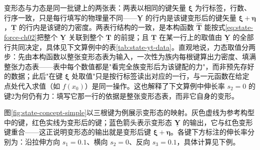 变形态与力态是同一批键上的两张表：两表以相同的键矢量 $\boldsymbol{\xi}$ 为行标签，行数、行序一致，只是每行填写的物理量不同——$\underline{\mathbf{Y}}$ 的行内是该键变形后的键矢量 $\boldsymbol{\xi}+\boldsymbol{\eta}$，$\underline{\mathbf{T}}$ 的行内是该键的力密度。两表行结构的一致，是本构函数 $\hat{\underline{\mathbf{T}}}$ 能按式\eqref{eq:state-force-ch02}把整个 $\underline{\mathbf{Y}}$ 关联到整个 $\underline{\mathbf{T}}$ 的前提；且 $\underline{\mathbf{T}}$ 在某一行上的取值由 $\underline{\mathbf{Y}}$ 的全部行共同决定，具体见下文算例中的表\ref{tab:state-yt-data}。直观地说，力态取值分两步：先由本构函数以整张变形态表为输入，一次性为族内每根键算出力密度、填满整张力态表——表中每个数值都是"看完全族变形后为该键配的力"，而非预先存好的数据；此后"在键 $\boldsymbol{\xi}$ 处取值"只是按行标签读出对应的一行，与一元函数在给定点处代入求值（如 $f(x_0)$）是同一操作。这也解释了下文算例中伸长率 $s_2=0$ 的键2为何仍有力：填写它那一行的依据是整张变形态表，而非它自身的变形。

图\ref{fig:state-concept-simple}以三根键为例展示变形态的映射。灰色虚线为参考构型中的键，红色实线为变形后的键；蓝色箭头表示变形态 $\underline{\mathbf{Y}}$ 的输出，它与红色变形键重合——这正说明变形态的输出就是变形后键 $\boldsymbol{\xi}+\boldsymbol{\eta}$。各键下方标注的伸长率分别为：沿拉伸方向 $s_1=0.1$、横向 $s_2=0$、反向 $s_3=0.1$，具体计算见下例。

